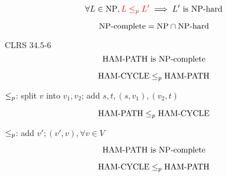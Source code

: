 
\begin{frame}
  \begin{definition}
  \end{definition}
\end{frame}

\begin{frame}
  \[
	\forall L \in \text{NP}, \textcolor{red}{L \le_{p} L'} \implies L' \text{ is } \text{NP-hard}
  \]

  \[
	\text{NP-complete} = \text{NP} \cap \text{NP-hard}
  \]
\end{frame}

\begin{frame}
\end{frame}

\begin{frame}
  \begin{exampleblock}{CLRS $34.5$-$6$}
	\[
	  \text{HAM-PATH is } \text{NP-complete}
	\]
  \end{exampleblock}

  \pause
  \[
	\text{HAM-CYCLE} \le_{p} \text{HAM-PATH}
  \]

  \centerline{$\le_{p}$: split $v$ into $v_1, v_2$; add $s, t, (s,v_1), (v_2, t)$}
\end{frame}

\begin{frame}
  \[
	\text{HAM-PATH} \le_{p} \text{HAM-CYCLE}
  \]

  \centerline{$\le_{p}$: add $v'; (v', v), \forall v \in V $}
\end{frame}

\begin{frame}
  \[
	\text{HAM-PATH is } \text{NP-complete}
  \]

  \[
	\text{HAM-CYCLE} \le_{p} \text{HAM-PATH}
  \]
\end{frame}

\begin{frame}
\end{frame}

